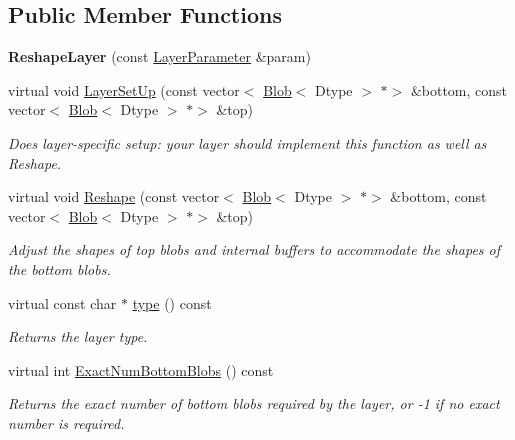 \subsection*{Public Member Functions}
\begin{DoxyCompactItemize}
\item 
\mbox{\label{classcaffe_1_1_reshape_layer_a395797dafb00e39da4f9c60f0554eece}} 
{\bfseries Reshape\+Layer} (const \mbox{\hyperlink{classcaffe_1_1_layer_parameter}{Layer\+Parameter}} \&param)
\item 
virtual void \mbox{\hyperlink{classcaffe_1_1_reshape_layer_a99db2601ec64ff20880641b6f6429947}{Layer\+Set\+Up}} (const vector$<$ \mbox{\hyperlink{classcaffe_1_1_blob}{Blob}}$<$ Dtype $>$ $\ast$$>$ \&bottom, const vector$<$ \mbox{\hyperlink{classcaffe_1_1_blob}{Blob}}$<$ Dtype $>$ $\ast$$>$ \&top)
\begin{DoxyCompactList}\small\item\em Does layer-\/specific setup\+: your layer should implement this function as well as Reshape. \end{DoxyCompactList}\item 
virtual void \mbox{\hyperlink{classcaffe_1_1_reshape_layer_a5b85ce44e23b4f958a60ff2b2c43e61f}{Reshape}} (const vector$<$ \mbox{\hyperlink{classcaffe_1_1_blob}{Blob}}$<$ Dtype $>$ $\ast$$>$ \&bottom, const vector$<$ \mbox{\hyperlink{classcaffe_1_1_blob}{Blob}}$<$ Dtype $>$ $\ast$$>$ \&top)
\begin{DoxyCompactList}\small\item\em Adjust the shapes of top blobs and internal buffers to accommodate the shapes of the bottom blobs. \end{DoxyCompactList}\item 
\mbox{\label{classcaffe_1_1_reshape_layer_a127379b9839d0f8f464d78cae28a6118}} 
virtual const char $\ast$ \mbox{\hyperlink{classcaffe_1_1_reshape_layer_a127379b9839d0f8f464d78cae28a6118}{type}} () const
\begin{DoxyCompactList}\small\item\em Returns the layer type. \end{DoxyCompactList}\item 
virtual int \mbox{\hyperlink{classcaffe_1_1_reshape_layer_ad97ea6043b01351e85b39b512ae0e489}{Exact\+Num\+Bottom\+Blobs}} () const
\begin{DoxyCompactList}\small\item\em Returns the exact number of bottom blobs required by the layer, or -\/1 if no exact number is required. \end{DoxyCompactList}\item 

\end{DoxyCompactItemize}
